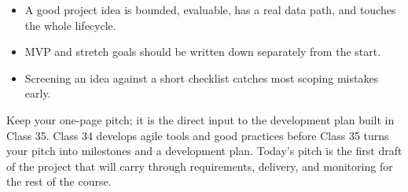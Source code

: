 \classclosingframe
{\begin{itemize}
\item A good project idea is bounded, evaluable, has a real data path, and touches the whole lifecycle.
\item MVP and stretch goals should be written down separately from the start.
\item Screening an idea against a short checklist catches most scoping mistakes early.
\end{itemize}}
{Keep your one-page pitch; it is the direct input to the development plan built in Class 35.}
{Class 34 develops agile tools and good practices before Class 35 turns your pitch into milestones and a development plan.}
{Today's pitch is the first draft of the project that will carry through requirements, delivery, and monitoring for the rest of the course.}


